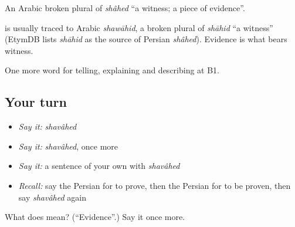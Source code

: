 An Arabic broken plural of \emph{shâhed} \textquotedblleft{}a witness; a piece of evidence\textquotedblright{}.

\begin{cousinweb}
\textbf{} is usually traced to Arabic \emph{shawāhid}, a broken plural of \emph{shāhid} \textquotedblleft{}a witness\textquotedblright{} (EtymDB lists \emph{shāhid} as the source of Persian \emph{shâhed}). Evidence is what bears witness.
\end{cousinweb}

\begin{grammarlens}[title={What you've built}]
One more word for telling, explaining and describing at B1.
\end{grammarlens}

\subsection*{Your turn}
\begin{itemize}
\raggedright
  \item \emph{Say it:} \emph{shavâhed}
  \item \emph{Say it:} \emph{shavâhed}, once more
  \item \emph{Say it:} a sentence of your own with \emph{shavâhed}
  \item \emph{Recall:} say the Persian for to prove, then the Persian for to be proven, then say \emph{shavâhed} again
\end{itemize}

\begin{tcolorbox}[breakable,colback=teal!4,colframe=teal!35!black,title={Before you move on}]
What does  mean? (\textquotedblleft{}Evidence\textquotedblright{}.) Say it once more.
\end{tcolorbox}
